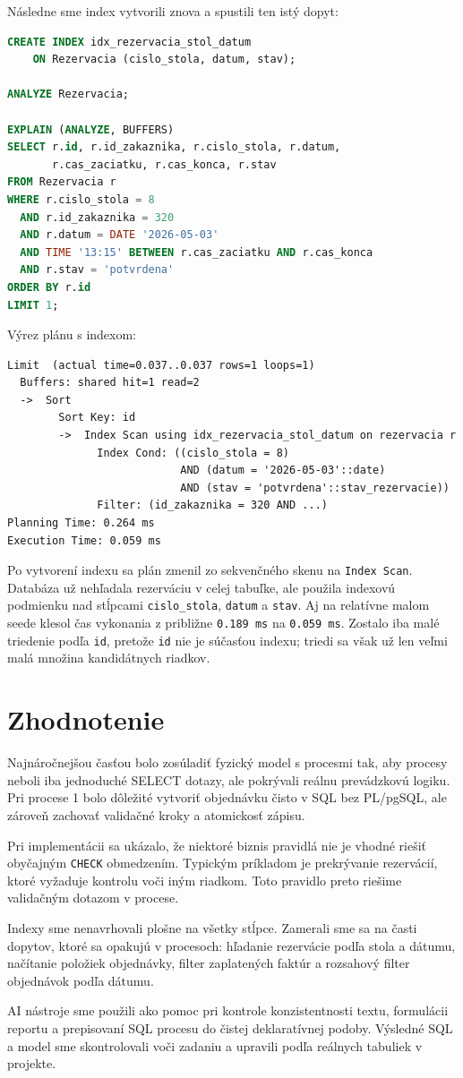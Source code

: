 \documentclass[11pt, a4paper]{article}
\begin{document}
Následne sme index vytvorili znova a spustili ten istý dopyt:

\begin{lstlisting}[language=SQL]
CREATE INDEX idx_rezervacia_stol_datum
    ON Rezervacia (cislo_stola, datum, stav);

ANALYZE Rezervacia;

EXPLAIN (ANALYZE, BUFFERS)
SELECT r.id, r.id_zakaznika, r.cislo_stola, r.datum,
       r.cas_zaciatku, r.cas_konca, r.stav
FROM Rezervacia r
WHERE r.cislo_stola = 8
  AND r.id_zakaznika = 320
  AND r.datum = DATE '2026-05-03'
  AND TIME '13:15' BETWEEN r.cas_zaciatku AND r.cas_konca
  AND r.stav = 'potvrdena'
ORDER BY r.id
LIMIT 1;
\end{lstlisting}

Výrez plánu s indexom:

\begin{lstlisting}
Limit  (actual time=0.037..0.037 rows=1 loops=1)
  Buffers: shared hit=1 read=2
  ->  Sort
        Sort Key: id
        ->  Index Scan using idx_rezervacia_stol_datum on rezervacia r
              Index Cond: ((cislo_stola = 8)
                           AND (datum = '2026-05-03'::date)
                           AND (stav = 'potvrdena'::stav_rezervacie))
              Filter: (id_zakaznika = 320 AND ...)
Planning Time: 0.264 ms
Execution Time: 0.059 ms
\end{lstlisting}

Po vytvorení indexu sa plán zmenil zo sekvenčného skenu na \texttt{Index Scan}. Databáza už
nehľadala rezerváciu v celej tabuľke, ale použila indexovú podmienku nad stĺpcami
\texttt{cislo\_stola}, \texttt{datum} a \texttt{stav}. Aj na relatívne malom seede klesol čas
vykonania z približne \texttt{0.189 ms} na \texttt{0.059 ms}. Zostalo iba malé triedenie podľa
\texttt{id}, pretože \texttt{id} nie je súčasťou indexu; triedi sa však už len veľmi malá množina
kandidátnych riadkov.

\section{Zhodnotenie}

Najnáročnejšou časťou bolo zosúladiť fyzický model s procesmi tak, aby procesy neboli iba
jednoduché SELECT dotazy, ale pokrývali reálnu prevádzkovú logiku. Pri procese 1 bolo dôležité
vytvoriť objednávku čisto v SQL bez PL/pgSQL, ale zároveň zachovať validačné kroky a atomickosť
zápisu.

Pri implementácii sa ukázalo, že niektoré biznis pravidlá nie je vhodné riešiť obyčajným
\texttt{CHECK} obmedzením. Typickým príkladom je prekrývanie rezervácií, ktoré vyžaduje kontrolu
voči iným riadkom. Toto pravidlo preto riešime validačným dotazom v procese.

Indexy sme nenavrhovali plošne na všetky stĺpce. Zamerali sme sa na časti dopytov, ktoré sa opakujú
v procesoch: hľadanie rezervácie podľa stola a dátumu, načítanie položiek objednávky, filter
zaplatených faktúr a rozsahový filter objednávok podľa dátumu.

AI nástroje sme použili ako pomoc pri kontrole konzistentnosti textu, formulácii reportu a
prepisovaní SQL procesu do čistej deklaratívnej podoby. Výsledné SQL a model sme skontrolovali
voči zadaniu a upravili podľa reálnych tabuliek v projekte.
\end{document}
